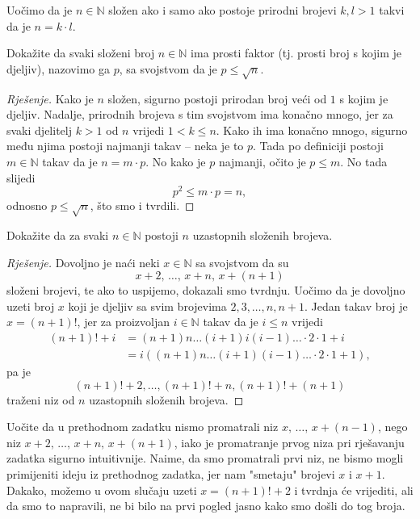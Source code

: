 \noindent Uočimo da je $n\in \mathbb{N}$ složen ako i samo ako postoje prirodni brojevi $k, l>1$ takvi da je $n=k\cdot l$.
\begin{exercise}
Dokažite da svaki složeni broj $n\in \mathbb{N}$ ima prosti faktor (tj. prosti broj s kojim je djeljiv), nazovimo ga $p$, sa svojstvom da je $p\leq \sqrt{n}$.
\end{exercise}
\begin{proof}[Rješenje]
Kako je $n$ složen, sigurno postoji prirodan broj veći od $1$ s kojim je djeljiv. Nadalje, prirodnih brojeva s tim svojstvom ima konačno mnogo, jer za svaki djelitelj $k>1$ od $n$ vrijedi $1<k\leq n$. Kako ih ima konačno mnogo, sigurno među njima postoji najmanji takav -- neka je to $p$. Tada po definiciji postoji $m\in \mathbb{N}$ takav da je $n=m\cdot p$. No kako je $p$ najmanji, očito je $p\leq m$. No tada slijedi $$p^2\leq m\cdot p=n,$$ odnosno $p\leq \sqrt{n}$, što smo i tvrdili.
\end{proof}
\begin{exercise}
Dokažite da za svaki $n\in \mathbb{N}$ postoji $n$ uzastopnih složenih brojeva.
\end{exercise}
\begin{proof}[Rješenje]
Dovoljno je naći neki $x\in \mathbb{N}$ sa svojstvom da su 
$$x+2,\, \dots,\, x+n,\, x+(n+1)$$ 
složeni brojevi, te ako to uspijemo, dokazali smo tvrdnju. Uočimo da je dovoljno uzeti broj $x$ koji je djeljiv sa svim brojevima $2, 3, \dots, n, n+1$. Jedan takav broj je $x=(n+1)!$, jer za proizvoljan $i\in \mathbb{N}$ takav da je $i\leq n$ vrijedi
\begin{align*}
(n+1)!+i&=(n+1)n\dots (i+1)i(i-1)\dots\cdot2\cdot1+i\\
&=i\left((n+1)n\dots (i+1)(i-1)\dots\cdot2\cdot1+1\right),
\end{align*}
pa je $$(n+1)!+2, \dots, (n+1)!+n, (n+1)!+(n+1)$$
traženi niz od $n$ uzastopnih složenih brojeva.
\end{proof}
\begin{remark}
Uočite da u prethodnom zadatku nismo promatrali niz $x,\, \dots,\, x+(n-1)$, nego niz $x+2,\, \dots,\, x+n,\, x+(n+1)$, iako je promatranje prvog niza pri rješavanju zadatka sigurno intuitivnije. Naime, da smo promatrali prvi niz, ne bismo mogli primijeniti ideju iz prethodnog zadatka, jer nam "smetaju" brojevi $x$ i $x+1$. Dakako, možemo u ovom slučaju uzeti $x=(n+1)!+2$ i tvrdnja će vrijediti, ali da smo to napravili, ne bi bilo na prvi pogled jasno kako smo došli do tog broja.
\end{remark}

